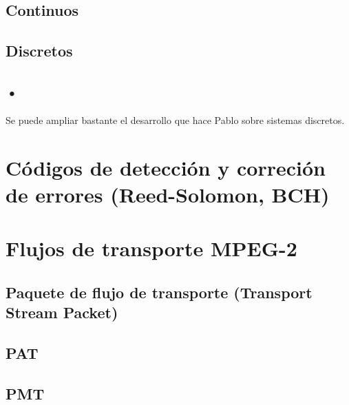 \subsection{Continuos}

\subsection{Discretos}

\subsection{•}
Se puede ampliar bastante el desarrollo que hace Pablo sobre sistemas discretos. 

\section{Códigos de detección y correción de errores (Reed-Solomon, BCH)}


\section{Flujos de transporte MPEG-2}
\subsection{Paquete de flujo de transporte (Transport Stream Packet)}
\subsection{PAT}
\subsection{PMT}

